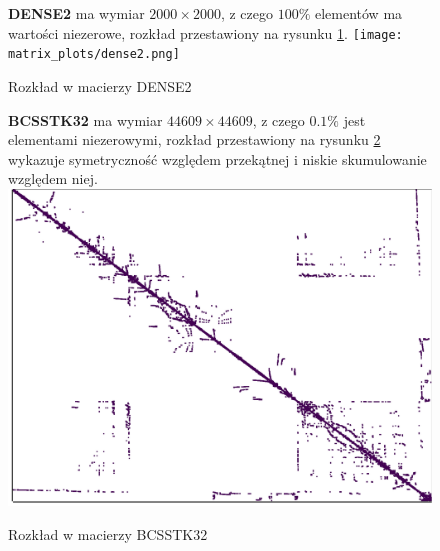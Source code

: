 \pagebreak

\begin{figure}[!htb]
    \textbf{DENSE2} ma wymiar $2000 \times 2000$, z czego $100\%$ elementów ma wartości niezerowe, rozkład przestawiony na rysunku \ref{dense2_plot}.
\endminipage\hfill
{}
  \texttt{[image: matrix\_plots/dense2.png]}
  \caption{Rozkład w macierzy DENSE2}\label{dense2_plot}
\endminipage\hfill
\end{figure}

\begin{figure}[!htb]
    \textbf{BCSSTK32} ma wymiar $44609 \times 44609$, z czego $0.1\%$ jest elementami niezerowymi, rozkład przestawiony na rysunku \ref{bcsstk32_plot} wykazuje symetryczność względem przekątnej i niskie skumulowanie względem niej.
\endminipage\hfill
{}
  \includegraphics[width=\linewidth]{matrix_plots/bcsstk32.png}
  \caption{Rozkład w macierzy BCSSTK32}\label{bcsstk32_plot}
\endminipage\hfill
\end{figure}

